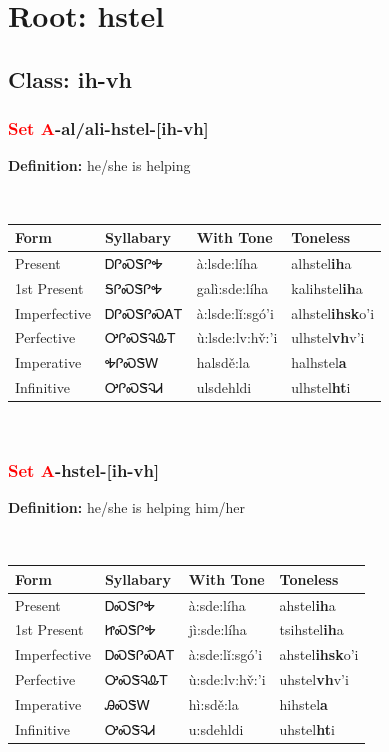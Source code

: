 \needspace{4in}
\section*{Root: hstel}
\nopagebreak
{}
\needspace{3in}
\subsection*{Class: ih-vh}
\nopagebreak
\needspace{2in}
\subsubsection*{\textcolor{Red}{Set A}{-}al/ali{-}\textbf{hstel}{-}[ih-vh]}
\nopagebreak
\textbf{Definition: } he/she is helping
\\[0.5em]
\begin{tabularx}{\textwidth}{l X X X}%
\toprule%
\textbf{Form}&\textbf{Syllabary}&\textbf{With Tone}&\textbf{Toneless}\\%
\midrule%
Present&ᎠᎵᏍᏕᎵᎭ&à:lsde:líha&alhstel\textbf{ih}a\\%
1st Present&ᎦᎵᏍᏕᎵᎭ&galì:sde:líha&kalihstel\textbf{ih}a\\%
Imperfective&ᎠᎵᏍᏕᎵᏍᎪᎢ&à:lsde:lǐ:sgó’i&alhstel\textbf{ihsk}o'i\\%
Perfective&ᎤᎵᏍᏕᎸᎲᎢ&ù:lsde:lv:hv̌:’i&ulhstel\textbf{vh}v'i\\%
Imperative&ᎭᎵᏍᏕᎳ&halsdě:la&halhstel\textbf{a}\\%
Infinitive&ᎤᎵᏍᏕᎸᏗ&ulsdehldi&ulhstel\textbf{ht}i\\%
\bottomrule%
\end{tabularx}
\\[1em]
\needspace{2in}
\subsubsection*{\textcolor{Red}{Set A}{-}\textbf{hstel}{-}[ih-vh]}
\nopagebreak
\textbf{Definition: } he/she is helping him/her
\\[0.5em]
\begin{tabularx}{\textwidth}{l X X X}%
\toprule%
\textbf{Form}&\textbf{Syllabary}&\textbf{With Tone}&\textbf{Toneless}\\%
\midrule%
Present&ᎠᏍᏕᎵᎭ&à:sde:líha&ahstel\textbf{ih}a\\%
1st Present&ᏥᏍᏕᎵᎭ&jì:sde:líha&tsihstel\textbf{ih}a\\%
Imperfective&ᎠᏍᏕᎵᏍᎪᎢ&à:sde:lǐ:sgó’i&ahstel\textbf{ihsk}o'i\\%
Perfective&ᎤᏍᏕᎸᎲᎢ&ù:sde:lv:hv̌:’i&uhstel\textbf{vh}v'i\\%
Imperative&ᎯᏍᏕᎳ&hì:sdě:la&hihstel\textbf{a}\\%
Infinitive&ᎤᏍᏕᎸᏗ&u:sdehldi&uhstel\textbf{ht}i\\%
\bottomrule%
\end{tabularx}
\\[1em]